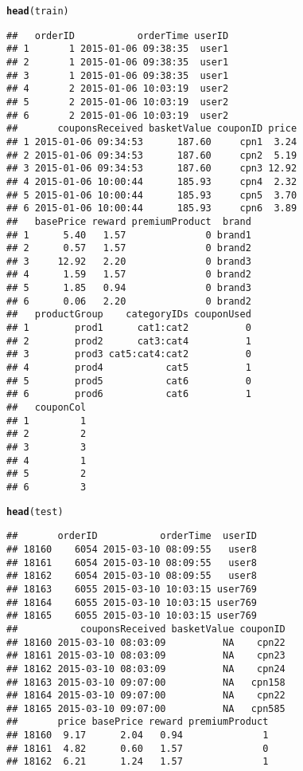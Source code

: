 \documentclass[10pt]{report}
\makeatletter
\newcommand{\hlstd}[1]{\textcolor[rgb]{0.345,0.345,0.345}{#1}}%
\newcommand{\hlkwd}[1]{\textcolor[rgb]{0.737,0.353,0.396}{\textbf{#1}}}%
\newenvironment{kframe}{%
 \def\at@end@of@kframe{}%
 \ifinner\ifhmode%
  \def\at@end@of@kframe{\end{minipage}}%
  \begin{minipage}{\columnwidth}%
 \fi\fi%
 \def\FrameCommand##1{\hskip\@totalleftmargin \hskip-\fboxsep
 \colorbox{shadecolor}{##1}\hskip-\fboxsep
     \hskip-\linewidth \hskip-\@totalleftmargin \hskip\columnwidth}%
 \MakeFramed {\advance\hsize-\width
   \@totalleftmargin\z@ \linewidth\hsize
   \@setminipage}}%
 {\par\unskip\endMakeFramed%
 \at@end@of@kframe}
\newenvironment{knitrout}{}{} %
\makeatother
\begin{document}
\begin{knitrout}
\begin{kframe}
\begin{alltt}
\hlkwd{head}\hlstd{(train)}
\end{alltt}
\begin{verbatim}
##   orderID           orderTime userID
## 1       1 2015-01-06 09:38:35  user1
## 2       1 2015-01-06 09:38:35  user1
## 3       1 2015-01-06 09:38:35  user1
## 4       2 2015-01-06 10:03:19  user2
## 5       2 2015-01-06 10:03:19  user2
## 6       2 2015-01-06 10:03:19  user2
##       couponsReceived basketValue couponID price
## 1 2015-01-06 09:34:53      187.60     cpn1  3.24
## 2 2015-01-06 09:34:53      187.60     cpn2  5.19
## 3 2015-01-06 09:34:53      187.60     cpn3 12.92
## 4 2015-01-06 10:00:44      185.93     cpn4  2.32
## 5 2015-01-06 10:00:44      185.93     cpn5  3.70
## 6 2015-01-06 10:00:44      185.93     cpn6  3.89
##   basePrice reward premiumProduct  brand
## 1      5.40   1.57              0 brand1
## 2      0.57   1.57              0 brand2
## 3     12.92   2.20              0 brand3
## 4      1.59   1.57              0 brand2
## 5      1.85   0.94              0 brand3
## 6      0.06   2.20              0 brand2
##   productGroup    categoryIDs couponUsed
## 1        prod1      cat1:cat2          0
## 2        prod2      cat3:cat4          1
## 3        prod3 cat5:cat4:cat2          0
## 4        prod4           cat5          1
## 5        prod5           cat6          0
## 6        prod6           cat6          1
##   couponCol
## 1         1
## 2         2
## 3         3
## 4         1
## 5         2
## 6         3
\end{verbatim}
\begin{alltt}
\hlkwd{head}\hlstd{(test)}
\end{alltt}
\begin{verbatim}
##       orderID           orderTime  userID
## 18160    6054 2015-03-10 08:09:55   user8
## 18161    6054 2015-03-10 08:09:55   user8
## 18162    6054 2015-03-10 08:09:55   user8
## 18163    6055 2015-03-10 10:03:15 user769
## 18164    6055 2015-03-10 10:03:15 user769
## 18165    6055 2015-03-10 10:03:15 user769
##           couponsReceived basketValue couponID
## 18160 2015-03-10 08:03:09          NA    cpn22
## 18161 2015-03-10 08:03:09          NA    cpn23
## 18162 2015-03-10 08:03:09          NA    cpn24
## 18163 2015-03-10 09:07:00          NA   cpn158
## 18164 2015-03-10 09:07:00          NA    cpn22
## 18165 2015-03-10 09:07:00          NA   cpn585
##       price basePrice reward premiumProduct
## 18160  9.17      2.04   0.94              1
## 18161  4.82      0.60   1.57              0
## 18162  6.21      1.24   1.57              1

\end{verbatim}
\end{kframe}
\end{knitrout}
\end{document}
